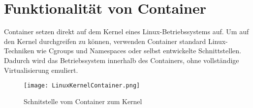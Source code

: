 \section{Funktionalität von Container}
\label{sec:Funktionalität von Container}

Container setzen direkt auf dem Kernel eines Linux-Betriebssystems auf. Um auf den Kernel durchgreifen zu können, verwenden Container standard Linux-Techniken wie Cgroups und Namespaces oder selbst entwickelte Schnittstellen. Dadurch wird das Betriebssystem innerhalb des Containers, ohne vollständige Virtualisierung emuliert.
\begin{figure}[H]
	\begin{center}
		\texttt{[image: LinuxKernelContainer.png]}
	\end{center}
	\caption[Schnitstelle vom Container zum Kernel]{Schnitstelle vom Container zum Kernel \footnotemark}
	\label{fig:HW1}
\end{figure}

